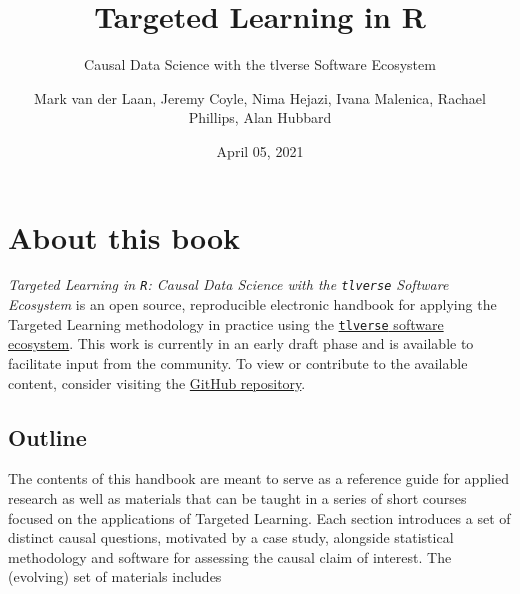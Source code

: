 \documentclass[12pt, krantz2,]{krantz}
\title{Targeted Learning in R}
\subtitle{Causal Data Science with the tlverse Software Ecosystem}
\author{Mark van der Laan, Jeremy Coyle, Nima Hejazi, Ivana Malenica, Rachael Phillips, Alan Hubbard}
\date{April 05, 2021}
\theoremstyle{definition}
\theoremstyle{definition}
\theoremstyle{definition}
\newcommand{\1}{\mathbbm{1}}
\begin{document}
\maketitle


\thispagestyle{empty}

\begin{center}
\end{center}

\setlength{\abovedisplayskip}{-5pt}
\setlength{\abovedisplayshortskip}{-5pt}

\mainmatter

{
\hypersetup{linkcolor=}
\setcounter{tocdepth}{3}
\tableofcontents
}
\listoftables
\listoffigures
\hypertarget{about-this-book}{%
\section*{About this book}\label{about-this-book}}


\emph{Targeted Learning in \texttt{R}: Causal Data Science with the \texttt{tlverse} Software
Ecosystem} is an open source, reproducible electronic handbook for applying the
Targeted Learning methodology in practice using the \href{https://github.com/tlverse}{\texttt{tlverse} software
ecosystem}. This work is currently in an early draft
phase and is available to facilitate input from the community. To view or
contribute to the available content, consider visiting the \href{https://github.com/tlverse/tlverse-handbook}{GitHub
repository}.

\hypertarget{outline}{%
\subsection{Outline}\label{outline}}

The contents of this handbook are meant to serve as a reference guide for
applied research as well as materials that can be taught in a series of short
courses focused on the applications of Targeted Learning. Each section
introduces a set of distinct causal questions, motivated by a case study,
alongside statistical methodology and software for assessing the causal claim of
interest. The (evolving) set of materials includes
\end{document}
